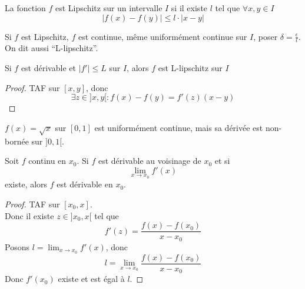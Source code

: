 \documentclass[../main.tex]{subfiles}
\begin{document}
\begin{defn}
La fonction $f$ est Lipschitz sur un intervalle $I$ si il existe $l$ tel que $\forall x, y \in I$ 
\[ 
	|f( x) -f( y) | \leq l \cdot |x-y|
\]

\end{defn}
\begin{rmq}
Si $f$ est Lipschitz, $f$ est continue, même uniformément continue sur $I$, poser $\delta = \frac{\epsilon}{l}$.\\
On dit aussi  ``L-lipschitz''.
\end{rmq}
\begin{crly}
Si $f$ est dérivable et $|f'|\leq L$ sur $I$, alors $f$ est L-lipschitz sur $I$
\end{crly}
\begin{proof}
	TAF sur $[x,y]$, donc
	\[ 
		\exists z \in ]x,y[: f( x) - f( y) = f'( z) ( x-y) 
	\]
\end{proof}
\begin{rmq}
	$f( x) = \sqrt x$ sur $[0,1]$ est uniformément continue, mais sa dérivée est non-bornée sur $]0,1[$.
\end{rmq}
\begin{crly}
Soit $f$ continu en $x_0$.
Si $f$ est dérivable au voisinage de $x_0$ et si 
\[ 
	\lim_{x \to x_0} f'( x) 
\]
existe, alors $f$ est dérivable en $x_0$.

\end{crly}

\begin{proof}
	TAF sur $[x_0,x]$.\\
	Donc il existe $z \in ]x_0,x[$ tel que 
	\[ 
		f'( z)  = \frac{f( x) - f( x_0) }{x-x_0}
	\]
	Posons $l= \lim_{x \to x_0} f'( x) $, donc
	\[ 
		l = \lim_{x \to x_0} \frac{f( x) - f( x_0) }{x-x_0}
	\]
	Donc $f'( x_0) $ existe et est égal à $l$.
\end{proof}
\end{document}

